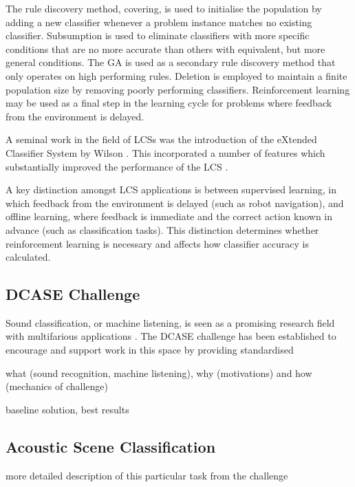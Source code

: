 \documentclass[11pt]{article}
\begin{document}
\begin{multicols}{2}
The rule discovery method, covering, is used to initialise the population by adding a new classifier whenever a problem instance matches no existing classifier. Subsumption is used to eliminate classifiers with more specific conditions that are no more accurate than others with equivalent, but more general conditions. The GA is used as a secondary rule discovery method that only operates on high performing rules. Deletion is employed to maintain a finite population size by removing poorly performing classifiers. Reinforcement learning may be used as a final step in the learning cycle for problems where feedback from the environment is delayed.

A seminal work in the field of LCSs was the introduction of the eXtended Classifier System by Wilson \cite{Lanzi2008,Sigaud2007}. This incorporated a number of features which substantially improved the performance of the LCS \cite{Lanzi2008}.

A key distinction amongst LCS applications is between supervised learning, in which feedback from the environment is delayed (such as robot navigation), and offline learning, where feedback is immediate and the correct action known in advance (such as classification tasks). This distinction determines whether reinforcement learning is necessary and affects how classifier accuracy is calculated.



\subsection{DCASE Challenge}
\label{sec:DCASE}

Sound classification, or machine listening, is seen as a promising research field with multifarious applications \cite{Mesaros2017}. The DCASE challenge has been established to encourage and support work in this space by providing standardised 



what (sound recognition, machine listening), why (motivations) and how (mechanics of challenge)

baseline solution, best results


\subsection{Acoustic Scene Classification}
\label{sec:ASC}

more detailed description of this particular task from the challenge




\end{multicols}
\end{document}
